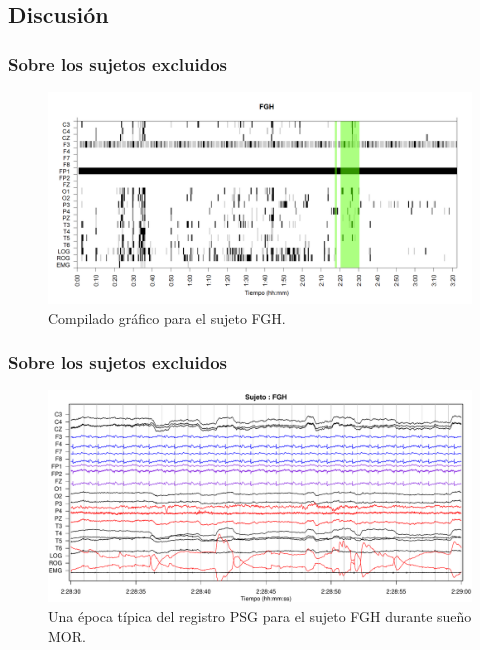 \documentclass{beamer}
\begin{document}
\subsection{Discusi\'on}

\begin{frame}\frametitle{Sobre los sujetos excluidos}
\begin{figure}
\centering
\includegraphics[width=0.95\linewidth]
{./img_ejemplos/FGHSUE_est.png} 
\caption{Compilado gr\'afico para el sujeto FGH.}
\end{figure}
\end{frame}


\begin{frame}\frametitle{Sobre los sujetos excluidos}
\begin{figure}
\centering
\includegraphics[width=0.95\linewidth]
{./img_ejemplos/FGH_297_PDG_lucirse_PSG.pdf} 
\caption{Una \'epoca t\'ipica del registro PSG para el sujeto FGH durante sue\~no MOR. }
\end{figure}
\end{frame}

\end{document}
